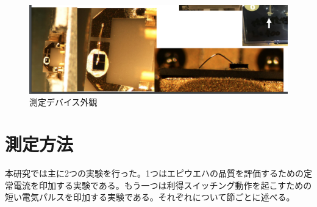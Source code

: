 \begin{figure}[t]
	\centering
	\includegraphics[width=15cm]{figure/fig_2_1_mount.png}
	\caption{測定デバイス外観}
	\label{fig_2_1_mount}
\end{figure}
\clearpage
\section{測定方法}%
本研究では主に2つの実験を行った。1つはエピウエハの品質を評価するための定常電流を印加する実験である。もう一つは利得スイッチング動作を起こすための短い電気パルスを印加する実験である。それぞれについて節ごとに述べる。
